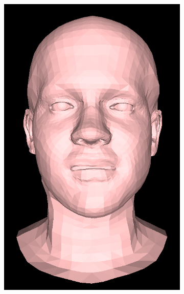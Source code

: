 \begin{figure}[h]
\begin{subfigure}[b]{0.24\textwidth}
        \includegraphics[width=\textwidth]{figures/blendshape_interp/4/00002.png}
    \end{subfigure}
    \begin{subfigure}[b]{0.24\textwidth}

\end{subfigure}
\end{figure}
